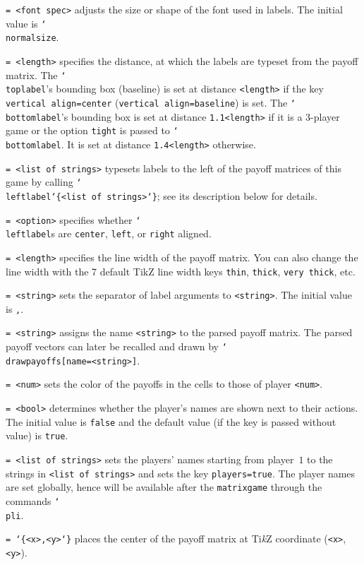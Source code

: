 \documentclass{article}
\newenvironment{desc}{\itemize[leftmargin=50pt]}{\enditemize}
\def\option#1#2{\item[\texttt{#1}] \hskip-1.5pt\texttt{#2}}
\renewcommand{\textbackslash}{\char`\\}
\def\cmd#1{\texttt{\color{cmd}\textbackslash#1}}
\def\leftbrace{\char`\{}
\def\rightbrace{\char`\}}
\def\arg#1{{\color{cmd}\leftbrace}{\color{black}#1}{\color{cmd}\rightbrace}}
\def\optarg[#1]{{\color{player1}[#1]}}
\def\TikZ{Ti\emph{k}Z\xspace}
\begin{document}
\begin{desc}
\option{label font}{= <font spec>} adjusts the size or shape of the font used in labels. The initial value is \cmd{normalsize}.

\option{label sep}{= <length>} specifies the distance, at which the labels are typeset from the payoff matrix. The \cmd{toplabel}'s bounding box (baseline) is set at distance \texttt{<length>} if the key \texttt{vertical align=center} (\texttt{vertical align=baseline}) is set. The \cmd{bottomlabel}'s bounding box is set at distance \texttt{1.1<length>} if it is a 3-player game or the option \texttt{tight} is passed to \cmd{bottomlabel}. It is set at distance \texttt{1.4<length>} otherwise.

\option{left}{= <list of strings>} typesets labels to the left of the payoff matrices of this game by calling \cmd{leftlabel\arg{<list of strings>}}; see its description below for details.
%
\option{left align}{= <option>} specifies whether \cmd{leftlabel}s are \texttt{center}, \texttt{left}, or \texttt{right} aligned.

\option{line width}{= <length>} specifies the line width of the payoff matrix. You can also change the line width with the 7 default TikZ line width keys \texttt{thin}, \texttt{thick}, \texttt{very thick}, etc.

\option{list sep}{= <string>} sets the separator of label arguments to \texttt{<string>}. The initial value is \texttt{,}.

\option{name}{= <string>} assigns the name \texttt{<string>} to the parsed payoff matrix. The parsed payoff vectors can later be recalled and drawn by \cmd{drawpayoffs\optarg[name=<string>]}.

\option{player}{= <num>} sets the color of the payoffs in the cells to those of player \texttt{<num>}. 

\option{players}{= <bool>} determines whether the player's names are shown next to their actions. The initial value is \texttt{false} and the default value (if the key is passed without value) is \texttt{true}.

\option{player names}{= <list of strings>} sets the players' names starting from player~$1$ to the strings in \texttt{<list of strings>} and sets the key \texttt{players=true}. The player names are set globally, hence will be available after the \texttt{matrixgame} through the commands \cmd{pli}.

\option{pos}{= \arg{<x>,<y>}} places the center of the payoff matrix at \TikZ coordinate (\texttt{<x>}, \texttt{<y>}).
%


\end{desc}
\end{document}
